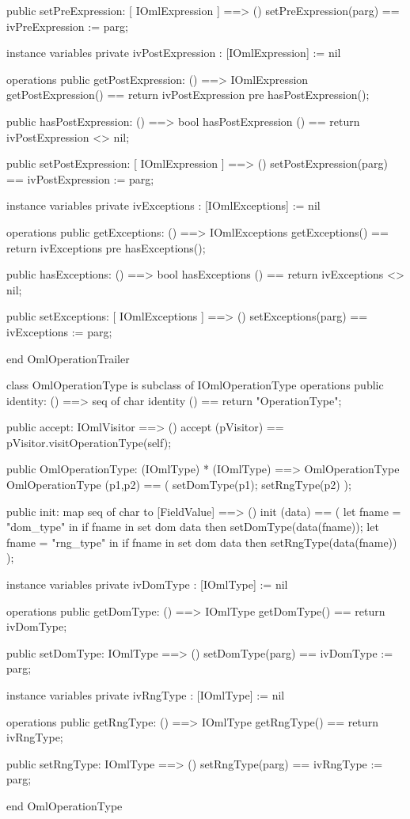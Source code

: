 \begin{vdm_al}
  public setPreExpression: [ IOmlExpression ] ==> ()
  setPreExpression(parg) == ivPreExpression := parg;

instance variables
  private ivPostExpression : [IOmlExpression] := nil

operations
  public getPostExpression: () ==> IOmlExpression
  getPostExpression() == return ivPostExpression
    pre hasPostExpression();

  public hasPostExpression: () ==> bool
  hasPostExpression () == return ivPostExpression <> nil;

  public setPostExpression: [ IOmlExpression ] ==> ()
  setPostExpression(parg) == ivPostExpression := parg;

instance variables
  private ivExceptions : [IOmlExceptions] := nil

operations
  public getExceptions: () ==> IOmlExceptions
  getExceptions() == return ivExceptions
    pre hasExceptions();

  public hasExceptions: () ==> bool
  hasExceptions () == return ivExceptions <> nil;

  public setExceptions: [ IOmlExceptions ] ==> ()
  setExceptions(parg) == ivExceptions := parg;

end OmlOperationTrailer
\end{vdm_al}

\begin{vdm_al}
class OmlOperationType is subclass of IOmlOperationType
operations
  public identity: () ==> seq of char
  identity () == return "OperationType";

  public accept: IOmlVisitor ==> ()
  accept (pVisitor) == pVisitor.visitOperationType(self);

  public OmlOperationType:
      (IOmlType) *
      (IOmlType) ==> OmlOperationType
  OmlOperationType (p1,p2) == 
   ( setDomType(p1);
     setRngType(p2) );

  public init: map seq of char to [FieldValue] ==> ()
  init (data) ==
    ( let fname = "dom_type" in
        if fname in set dom data
        then setDomType(data(fname));
      let fname = "rng_type" in
        if fname in set dom data
        then setRngType(data(fname)) );

instance variables
  private ivDomType : [IOmlType] := nil

operations
  public getDomType: () ==> IOmlType
  getDomType() == return ivDomType;

  public setDomType: IOmlType ==> ()
  setDomType(parg) == ivDomType := parg;

instance variables
  private ivRngType : [IOmlType] := nil

operations
  public getRngType: () ==> IOmlType
  getRngType() == return ivRngType;

  public setRngType: IOmlType ==> ()
  setRngType(parg) == ivRngType := parg;

end OmlOperationType
\end{vdm_al}

